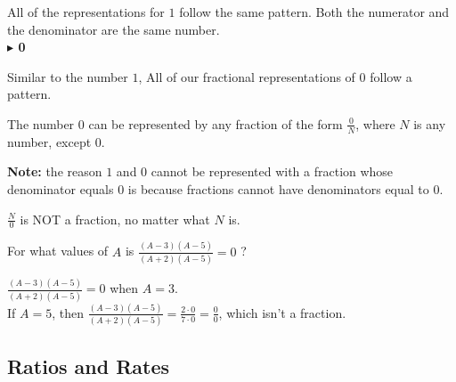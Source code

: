 \documentclass{ximera}
\begin{document}
All of the representations for $1$ follow the same pattern.  Both the numerator and the denominator are the same number. \\




\textbf{\textcolor{purple!85!blue}{$\blacktriangleright$ 0}} 


Similar to the number $1$, All of our fractional representations of $0$ follow a pattern.






\begin{idea}

The number $0$ can be represented by any fraction of the form $\frac{0}{N}$, where $N$ is any number, except $0$.


\end{idea}

\textbf{Note:} the reason $1$ and $0$ cannot be represented with a fraction whose denominator equals $0$ is because fractions cannot have denominators equal to $0$.






\begin{warning}


$\frac{N}{0}$ is NOT a fraction, no matter what $N$ is.



\end{warning}




\begin{example}


For what values of $A$ is  $\frac{(A-3)(A-5)}{(A+2)(A-5)} = 0$ ?


\begin{explanation}

$\frac{(A-3)(A-5)}{(A+2)(A-5)} = 0$ when $A = 3$. \\


If $A = 5$, then $\frac{(A-3)(A-5)}{(A+2)(A-5)} = \frac{2\cdot0}{7\cdot0} = \frac{0}{0}$, which isn't a fraction.



\end{explanation}


\end{example}



\subsection*{Ratios and Rates}
\end{document}
